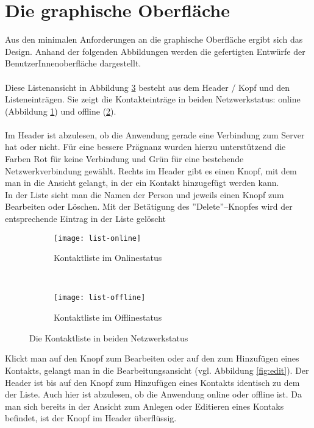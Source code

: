 \section{Die graphische Oberfläche}
Aus den minimalen Anforderungen an die graphische Oberfläche ergibt sich das Design.
Anhand der folgenden Abbildungen werden die gefertigten Entwürfe der BenutzerInnenoberfläche dargestellt.\\\\
Diese Listenansicht in Abbildung \ref{fig:list} besteht aus dem Header / Kopf und den Listeneinträgen.
Sie zeigt die Kontakteinträge in beiden Netzwerkstatus: online (Abbildung \ref{fig:list-online}) und offline (\ref{fig:list-offline}).\\\\
%
%
Im Header ist abzulesen, ob die Anwendung gerade eine Verbindung zum Server hat oder nicht.
Für eine bessere Prägnanz wurden hierzu unterstützend die Farben Rot für keine Verbindung und Grün für eine bestehende Netzwerkverbindung gewählt.
Rechts im Header gibt es einen Knopf, mit dem man in die Ansicht gelangt, in der ein Kontakt hinzugefügt werden kann.\\
%
In der Liste sieht man die Namen der Person und jeweils einen Knopf zum Bearbeiten oder Löschen.
Mit der Betätigung des ''Delete''--Knopfes wird der entsprechende Eintrag in der Liste gelöscht
\begin{figure}[H]
  \centering
  \begin{subfigure}[t]{0.49\textwidth}
          \texttt{[image: list-online]}
          \caption{Kontaktliste im Onlinestatus}
          \label{fig:list-online}
  \end{subfigure}
  ~ 
  \begin{subfigure}[t]{0.49\textwidth}
          \texttt{[image: list-offline]}
          \caption{Kontaktliste im Offlinestatus}
          \label{fig:list-offline}
  \end{subfigure}
  \grayRule
  \caption{Die Kontaktliste in beiden Netzwerkstatus}
  \label{fig:list}
\end{figure}
Klickt man auf den Knopf zum Bearbeiten oder auf den zum Hinzufügen eines Kontakts, gelangt man in die Bearbeitungsansicht (vgl. Abbildung \ref{fig:edit}). Der Header ist bis auf den Knopf zum Hinzufügen eines Kontakts identisch zu dem der Liste. Auch hier ist abzulesen, ob die Anwendung online oder offline ist. Da man sich bereits in der Ansicht zum Anlegen oder Editieren eines Kontaks befindet, ist der Knopf im Header überflüssig.\\
